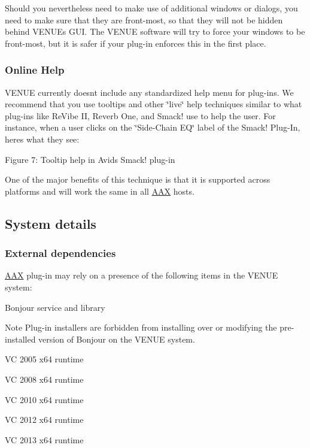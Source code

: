  Should you nevertheless need to make use of additional windows or dialogs, you need to make sure that they are front-\/most, so that they will not be hidden behind V\+E\+N\+U\+E\textquotesingle{}s G\+U\+I. The V\+E\+N\+U\+E software will try to force your windows to be front-\/most, but it is safer if your plug-\/in enforces this in the first place.

\hypertarget{a00377_subsection__aax_venue_guide__guidelines__help}{}\subsubsection{Online Help}\label{a00377_subsection__aax_venue_guide__guidelines__help}
 V\+E\+N\+U\+E currently doesn\textquotesingle{}t include any standardized help menu for plug-\/ins. We recommend that you use tooltips and other \char`\"{}live\char`\"{} help techniques similar to what plug-\/ins like Re\+Vibe I\+I, Reverb One, and Smack! use to help the user. For instance, when a user clicks on the \char`\"{}\+Side-\/\+Chain E\+Q\char`\"{} label of the Smack! Plug-\/\+In, here\textquotesingle{}s what they see\+:

  Figure 7\+: Tooltip help in Avid\textquotesingle{}s Smack! plug-\/in

 One of the major benefits of this technique is that it is supported across platforms and will work the same in all \hyperlink{a00288}{A\+A\+X} hosts.



 \hypertarget{a00377_aax_venue_guide__system_details}{}\subsection{System details}\label{a00377_aax_venue_guide__system_details}
 \hypertarget{a00377_subsection__aax_venue_guide__system_details__dependencies}{}\subsubsection{External dependencies}\label{a00377_subsection__aax_venue_guide__system_details__dependencies}
 \hyperlink{a00288}{A\+A\+X} plug-\/in may rely on a presence of the following items in the V\+E\+N\+U\+E system\+:

 
\begin{DoxyItemize}
\item Bonjour service and library

\begin{DoxyNote}{Note}
Plug-\/in installers are forbidden from installing over or modifying the pre-\/installed version of Bonjour on the V\+E\+N\+U\+E system. 
\end{DoxyNote}

\item V\+C 2005 x64 runtime 
\item V\+C 2008 x64 runtime 
\item V\+C 2010 x64 runtime 
\item V\+C 2012 x64 runtime 
\item V\+C 2013 x64 runtime 
\end{DoxyItemize}


